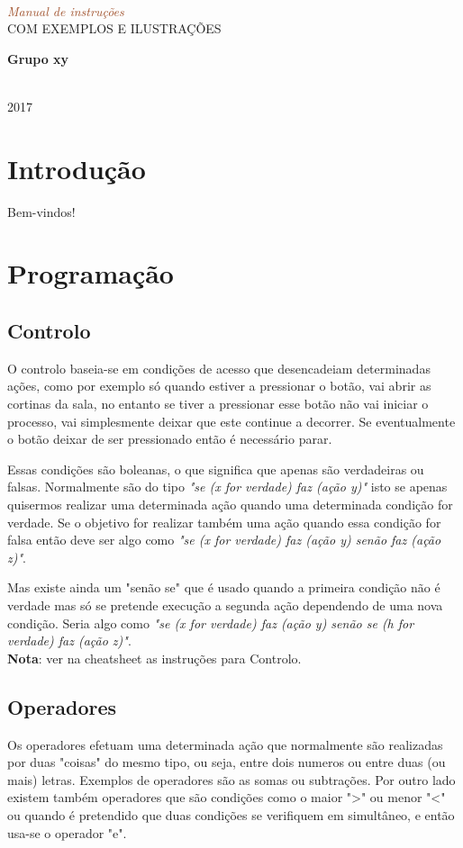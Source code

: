 \documentclass{article}
\newcommand*{\plogo}{\fbox{$\mathcal{ED}$}} %
\newcommand*{\rotrt}[1]{\rotatebox{90}{#1}} %
\newcommand*{\rotlft}[1]{\rotatebox{-90}{#1}} %
\newcommand*{\titleBC}{\begingroup %
\centering %

\def\CP{\textit{\Huge Manual de instruções}} %

\settowidth{\unitlength}{\CP} %
{\color{LightGoldenrod}\resizebox*{\unitlength}{\baselineskip}{\rotrt{$\}$}}} \\[\baselineskip] %
\textcolor{Sienna}{\CP} \\[\baselineskip] %
{\color{RosyBrown}\Large COM EXEMPLOS E ILUSTRAÇÕES} \\ %
{\color{LightGoldenrod}\resizebox*{\unitlength}{\baselineskip}{\rotlft{$\}$}}} %

\vfill %

{\Large\textbf{Grupo xy}}\\ %

\vfill %

\plogo\\[0.5\baselineskip] %
2017 %

\endgroup}
\begin{document}
\pagestyle{empty} %
\titleBC %

\pagebreak
\tableofcontents
\pagebreak

\section{Introdução}
Bem-vindos!

\section{Programação}

\subsection{Controlo}
O controlo baseia-se em condições de acesso que desencadeiam determinadas ações, como por exemplo só quando estiver a pressionar o botão, vai abrir as cortinas da sala, no entanto se tiver a pressionar esse botão não vai iniciar o processo, vai simplesmente deixar que este continue a decorrer. Se eventualmente o botão deixar de ser pressionado então é necessário parar.\newline

Essas condições são boleanas, o que significa que apenas são verdadeiras ou falsas.
Normalmente são do tipo \textit{"se (x for verdade) faz (ação y)"} isto se apenas quisermos realizar uma determinada ação quando uma determinada condição for verdade. Se o objetivo for realizar também uma ação quando essa condição for falsa então deve ser algo como \textit{"se (x for verdade) faz (ação y) senão faz (ação z)"}.\newline

Mas existe ainda um "senão se" que é usado quando a primeira condição não é verdade mas só se pretende execução a segunda ação dependendo de uma nova condição. Seria algo como \textit{"se (x for verdade) faz (ação y) senão se (h for verdade) faz (ação z)"}. \newline \\
\textbf{Nota}: ver na cheatsheet as instruções para Controlo. \\

\subsection{Operadores}
Os operadores efetuam uma determinada ação que normalmente são realizadas por duas "coisas" do mesmo tipo, ou seja, entre dois numeros ou entre duas (ou mais) letras. Exemplos de operadores são as somas ou subtrações. Por outro lado existem também operadores que são condições como o maior ">" ou menor "<" ou quando é pretendido que duas condições se verifiquem em simultâneo, e então usa-se o operador "e".
\end{document}
